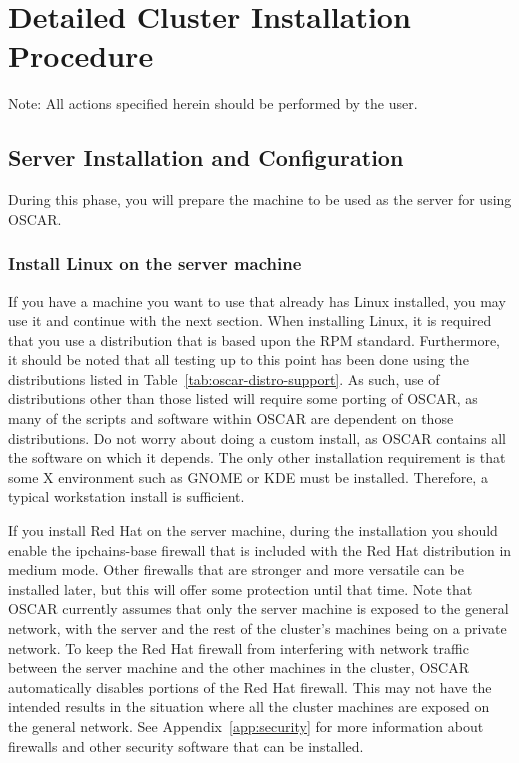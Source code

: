 %
%
%

\section{Detailed Cluster Installation Procedure}
\label{det:top}

Note: All actions specified herein should be performed by the
 user.


\subsection{Server Installation and Configuration}
\label{det:serverinstall}
  
During this phase, you will prepare the machine to be used as the
server for using OSCAR.

\subsubsection{Install Linux on the server machine} 
\label{det:serverosinstall}

If you have a machine you want to use that already has Linux
installed, you may use it and continue with the next section. When
installing Linux, it is required that you use a distribution that is
based upon the RPM standard.  Furthermore, it should be noted that all
testing up to this point has been done using the distributions listed
in Table~\ref{tab:oscar-distro-support}.  As such, use of
distributions other than those listed will require some porting of
OSCAR, as many of the scripts and software within OSCAR are dependent
on those distributions. Do not worry about doing a custom install, as
OSCAR contains all the software on which it depends.  The only other
installation requirement is that some X environment such as GNOME or
KDE must be installed. Therefore, a typical workstation install is
sufficient.

If you install Red Hat on the server machine, during the
installation you should enable the ipchains-base firewall that is
included with the Red Hat distribution in medium mode.  Other
firewalls that are stronger and more versatile can be installed later,
but this will offer some protection until that time.  Note that OSCAR
currently assumes that only the server machine is exposed to the
general network, with the server and the rest of the cluster's
machines being on a private network. To keep the Red Hat firewall from
interfering with network traffic between the server machine and the
other machines in the cluster, OSCAR automatically disables portions
of the Red Hat firewall. This may not have the intended results in the
situation where all the cluster machines are exposed on the general
network.  See Appendix~\ref{app:security} for more information about
firewalls and other security software that can be installed.

